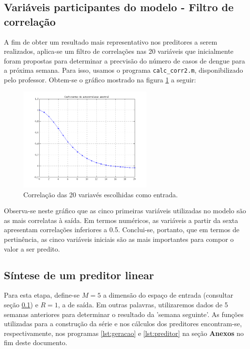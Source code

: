 	\FloatBarrier

\subsection{Variáveis participantes do modelo - Filtro de correlação}
 \label{sec:corr}

A fim de obter um resultado mais representativo nos preditores a serem
realizados, aplica-se um filtro de correlações nas 20 variáveis que inicialmente
foram propostas para determinar a precvisão do número de casos de dengue para a
próxima semana. Para isso, usamos o programa \texttt{calc\_corr2.m},
disponibilizado pelo professor. Obtem-se o gráfico mostrado na figura
\ref{fig:corr_variavel} a seguir:

	\begin{figure}[H]
			\centering
			  \includegraphics[width=0.60\textwidth]{image/corr_variaveis_preditor}
			  \caption{Correlação das 20 variavés escolhidas como entrada.} 
			  \label{fig:corr_variavel}
	\end{figure}
	
	\FloatBarrier
	
Observa-se neste gráfico que as cinco primeiras variáveis utilizadas no modelo
são as mais correlatas à saída. Em termos numéricos, as variáveis a partir da
sexta apresentam correlações inferiores a 0.5. Conclui-se, portanto, que em
termos de pertinência, as cinco variáveis iniciais são as mais importantes para
compor o valor a ser predito.

\subsection{Síntese de um preditor linear}
 
Para esta etapa, define-se \(M = 5\) a dimensão do espaço de entrada (consultar
seção \ref{sec:corr}) e \(R = 1\), a de saída. Em outras palavras, utilizaremos
dados de 5 semanas anteriores para determinar o resultado da 'semana seguinte'. As funções
utilizadas para a construção da série e nos cálculos dos preditores encontram-se, respectivamente, nos
programas \ref{lst:geracao} e \ref{lst:preditor} na seção
\textbf{Anexos} no fim deste documento.

